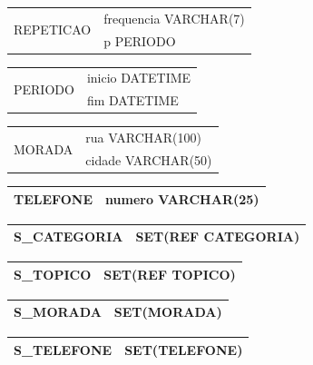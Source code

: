 \documentclass[a4paper,12pt]{article}
\begin{document}
\begin{multicols}{2}
		\begin{tabular}{|c|l|} \hline
			\multirow{2}{*}{REPETICAO}
			& frequencia VARCHAR(7) \\
			& p PERIODO \\ \hline 
		\end{tabular}
		
		\begin{tabular}{|c|l|} \hline
			\multirow{2}{*}{PERIODO}
			& inicio DATETIME \\
			& fim DATETIME \\ \hline 
		\end{tabular}
		
		\begin{tabular}{|c|l|} \hline
			\multirow{2}{*}{MORADA}
			& rua VARCHAR(100) \\
			& cidade VARCHAR(50) \\ \hline 
		\end{tabular}
		
		\begin{tabular}{|c|l|} \hline
			TELEFONE & numero VARCHAR(25) \\ \hline 
		\end{tabular}
		
		\begin{tabular}{|c|l|} \hline
			S\_CATEGORIA & SET(REF CATEGORIA) \\ \hline
		\end{tabular}
		
		\begin{tabular}{|c|l|} \hline
			S\_TOPICO & SET(REF TOPICO) \\ \hline
		\end{tabular}
		
		\begin{tabular}{|c|l|} \hline
			S\_MORADA & SET(MORADA) \\ \hline
		\end{tabular}
		
		\begin{tabular}{|c|l|} \hline
			S\_TELEFONE & SET(TELEFONE) \\ \hline
		\end{tabular}

	\end{multicols}
\end{document}

